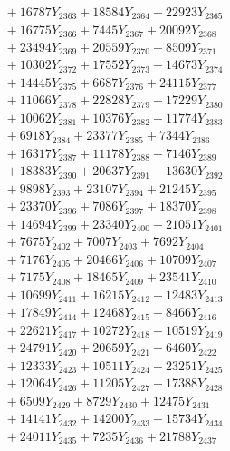 \documentclass[a4paper,10pt]{article}
\begin{document}
{\begin{align}
&\;  + 16787 Y_{2363} + 18584 Y_{2364} + 22923 Y_{2365} \\[0.3ex]
&\;  + 16775 Y_{2366} + 7445 Y_{2367} + 20092 Y_{2368} \\[0.5ex]\allowbreak
&\;  + 23494 Y_{2369} + 20559 Y_{2370} + 8509 Y_{2371} \\[0.3ex]
&\;  + 10302 Y_{2372} + 17552 Y_{2373} + 14673 Y_{2374} \\[0.3ex]
&\;  + 14445 Y_{2375} + 6687 Y_{2376} + 24115 Y_{2377} \\[0.3ex]
&\;  + 11066 Y_{2378} + 22828 Y_{2379} + 17229 Y_{2380} \\[0.3ex]
&\;  + 10062 Y_{2381} + 10376 Y_{2382} + 11774 Y_{2383} \\[0.3ex]
&\;  + 6918 Y_{2384} + 23377 Y_{2385} + 7344 Y_{2386} \\[0.3ex]
&\;  + 16317 Y_{2387} + 11178 Y_{2388} + 7146 Y_{2389} \\[0.3ex]
&\;  + 18383 Y_{2390} + 20637 Y_{2391} + 13630 Y_{2392} \\[0.3ex]
&\;  + 9898 Y_{2393} + 23107 Y_{2394} + 21245 Y_{2395} \\[0.3ex]
&\;  + 23370 Y_{2396} + 7086 Y_{2397} + 18370 Y_{2398} \\[0.5ex]\allowbreak
&\;  + 14694 Y_{2399} + 23340 Y_{2400} + 21051 Y_{2401} \\[0.3ex]
&\;  + 7675 Y_{2402} + 7007 Y_{2403} + 7692 Y_{2404} \\[0.3ex]
&\;  + 7176 Y_{2405} + 20466 Y_{2406} + 10709 Y_{2407} \\[0.3ex]
&\;  + 7175 Y_{2408} + 18465 Y_{2409} + 23541 Y_{2410} \\[0.3ex]
&\;  + 10699 Y_{2411} + 16215 Y_{2412} + 12483 Y_{2413} \\[0.3ex]
&\;  + 17849 Y_{2414} + 12468 Y_{2415} + 8466 Y_{2416} \\[0.3ex]
&\;  + 22621 Y_{2417} + 10272 Y_{2418} + 10519 Y_{2419} \\[0.3ex]
&\;  + 24791 Y_{2420} + 20659 Y_{2421} + 6460 Y_{2422} \\[0.3ex]
&\;  + 12333 Y_{2423} + 10511 Y_{2424} + 23251 Y_{2425} \\[0.3ex]
&\;  + 12064 Y_{2426} + 11205 Y_{2427} + 17388 Y_{2428} \\[0.5ex]\allowbreak
&\;  + 6509 Y_{2429} + 8729 Y_{2430} + 12475 Y_{2431} \\[0.3ex]
&\;  + 14141 Y_{2432} + 14200 Y_{2433} + 15734 Y_{2434} \\[0.3ex]
&\;  + 24011 Y_{2435} + 7235 Y_{2436} + 21788 Y_{2437} \\[0.3ex]

\end{align}}
\end{document}
